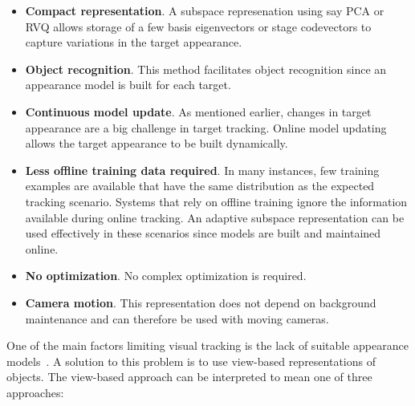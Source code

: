 \begin{itemize}
\item \textbf{Compact representation}.  A subspace represenation using say PCA or RVQ allows storage of a few basis eigenvectors or stage codevectors to capture variations in the target appearance.
\item \textbf{Object recognition}.  This method facilitates object recognition since an appearance model is built for each target.
\item \textbf{Continuous model update}.  As mentioned earlier, changes in target appearance are a big challenge in target tracking.  Online model updating allows the target appearance to be built dynamically.
\item \textbf{Less offline training data required}.  In many instances, few training examples are available that have the same distribution as the expected tracking scenario.  Systems that rely on offline training ignore the information available during online tracking.  An adaptive subspace representation can be used effectively in these scenarios since models are built and maintained online.
\item \textbf{No optimization}.  No complex optimization is required.
\item \textbf{Camera motion}.  This representation does not depend on background maintenance and can therefore be used with moving cameras.
\end{itemize}


One of the main factors limiting visual tracking is the lack of suitable appearance models~\cite{2003_JNL_TRKsubspace_Jepson}.  A solution to this problem is to use view-based representations of objects.  The view-based approach can be interpreted to mean one of three approaches:

